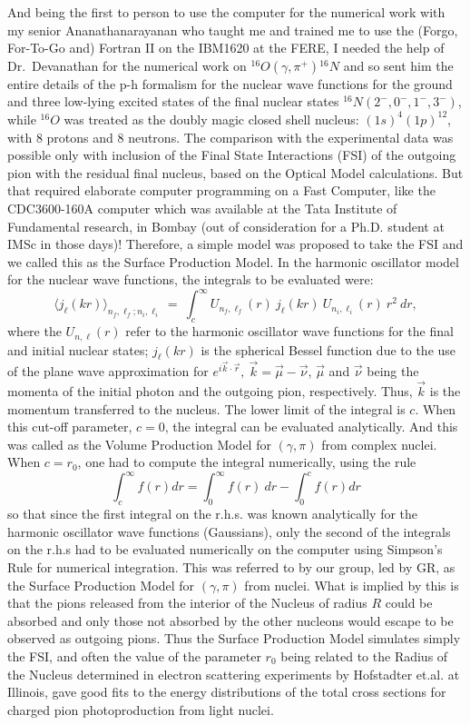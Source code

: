 And being the first to person to use the computer for the numerical work with my senior Ananathanarayanan who taught me and trained me to use the (Forgo, For-To-Go and) Fortran II on the IBM1620 at the FERE, I needed the help of Dr.\ Devanathan for the numerical work on ${}^{16}O(\gamma, \pi^+){}^{16}N$ and so sent him the entire details of the p-h formalism for the nuclear wave functions for the ground and three low-lying excited states of the final nuclear states $^{16}N(2^-,0^-,1^-,3^-)$, while $^{16}O$ was treated as the doubly magic closed shell nucleus: $(1s)^4(1p)^{12}$, with 8 protons and 8 neutrons. The comparison with the experimental data was possible only with inclusion of the Final State Interactions (FSI) of the outgoing pion with the residual final nucleus, based on the Optical Model calculations. But that required elaborate computer programming on a Fast Computer, like the CDC3600-160A computer which was available at the Tata Institute of Fundamental research, in Bombay (out of consideration for a Ph.D. student at IMSc in those days)! Therefore, a simple model was proposed to take the FSI and we called this as the Surface Production Model. In the harmonic oscillator model for the nuclear wave functions, the integrals to be evaluated were:
$$
\langle j_\ell(kr)\rangle_{n_f,\ell_f;n_i,\ell_i}\ =\  \int_c^\infty U_{n_f,\ell_f}(r)
\ j_{\ell}(kr)\ U_{n_i,\ell_i}(r)\ r^2\ dr,
$$
where the $U_{n,\ell}(r)$ refer to the harmonic oscillator wave functions for the final and initial nuclear states; $j_\ell(kr)$ is the spherical Bessel function due to the use of the plane wave approximation for $e^{i\vec{k}\cdot \vec{r}},\  \vec{k}=\vec{\mu}-\vec{\nu}$, $\vec{\mu}$ and $\vec{\nu}$ being the momenta of the initial photon and the outgoing pion, respectively. Thus, $\vec{k}$ is the momentum transferred to the nucleus. The lower limit of the integral is $c$. When this cut-off parameter, $c=0$, the integral can be evaluated analytically. And this was called as the Volume Production Model for $(\gamma,\pi)$ from complex nuclei. When $c=r_0$, one had to compute the integral numerically, using the rule
$$
\int_c^\infty f(r) dr = \int_0^\infty f(r)\ dr - \int_0^c f(r) dr
$$
so that since the first integral on the r.h.s. was known analytically for the harmonic oscillator wave functions (Gaussians), only the second of the integrals on the r.h.s had to be evaluated numerically on the computer using Simpson's Rule for numerical integration. This was referred to by our group, led by GR, as the Surface Production Model for $(\gamma,\pi)$ from nuclei. What is implied by this is that the pions released from the interior of the Nucleus of radius $R$ could be absorbed and only those not absorbed by the other nucleons would escape to be observed as outgoing pions. Thus the Surface Production Model simulates simply the FSI, and often the value of the parameter $r_0$ being related to the Radius of the Nucleus determined in electron scattering experiments by Hofstadter et.al. at Illinois, gave good fits to the energy distributions of the total cross sections for charged pion photoproduction from light nuclei.

